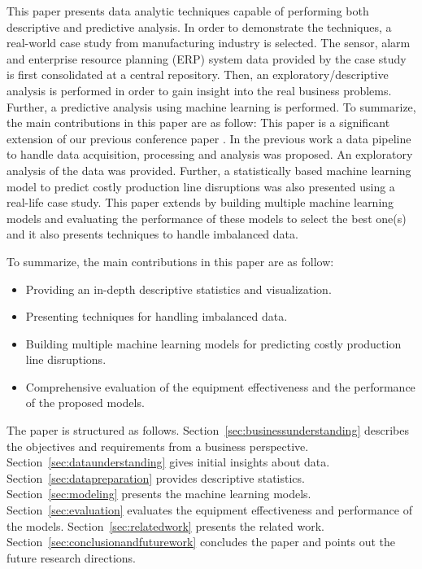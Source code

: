 \documentclass[runningheads]{llncs}
\begin{document}
This paper presents data analytic techniques capable of performing both descriptive and predictive analysis. In order to demonstrate the techniques, a real-world case study from manufacturing industry is selected. The sensor, alarm and enterprise resource planning (ERP) system data provided by the case study is first consolidated at a central repository. Then, an exploratory/descriptive analysis is performed in order to gain insight into the real business problems. Further, a predictive analysis using machine learning is performed. To summarize, the main contributions in this paper are as follow:
\fi
This paper is a significant extension of our previous conference paper \cite{nadeem}. In the previous work a data pipeline to handle data acquisition, processing and analysis was proposed. An exploratory analysis of the data was provided. Further, a statistically based machine learning model to predict costly production line disruptions was also presented using a real-life case study. This paper extends \cite{nadeem} by building multiple machine learning models and evaluating the performance of these models to select the best one(s) and it also presents techniques to handle imbalanced data.

To summarize, the main contributions in this paper are as follow:
\begin{itemize} 
\item Providing an in-depth descriptive statistics and visualization. 

\item Presenting techniques for handling imbalanced data.

\item Building multiple machine learning models for predicting costly production line disruptions.

\item Comprehensive evaluation of the equipment effectiveness and the performance of the proposed models.
\end{itemize} 

The paper is structured as follows. Section~\ref{sec:businessunderstanding} describes the objectives and requirements from a business perspective. Section~\ref{sec:dataunderstanding} gives initial insights about data. Section~\ref{sec:datapreparation} provides descriptive statistics. Section~\ref{sec:modeling} presents
the machine learning models. Section~\ref{sec:evaluation} evaluates the equipment effectiveness and performance of the models. Section~\ref{sec:relatedwork} presents the related work. Section~\ref{sec:conclusionandfuturework} concludes the paper and points out the future research directions.
\end{document}
